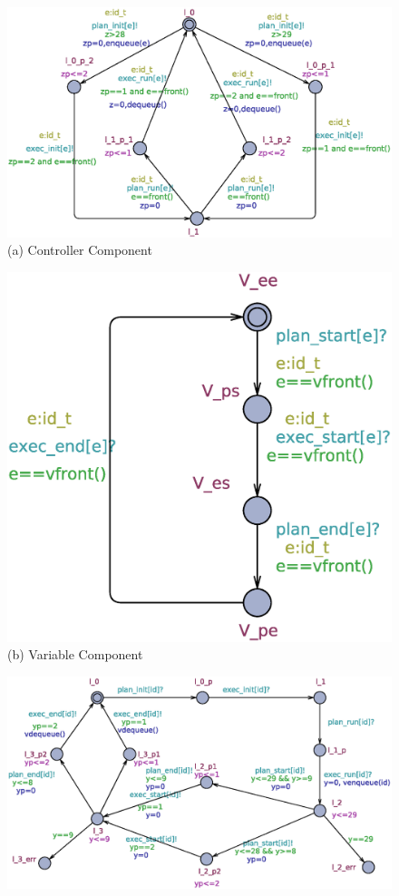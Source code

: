 \begin{figure}[ht] 
  \begin{minipage}[b]{0.5\linewidth}
  \centering
  \includegraphics[width=1.15\linewidth]{Figures/c.eps}\\ 
    (a) Controller Component 
  \vspace{4ex}
  \end{minipage}%
  \begin{minipage}[b]{0.5\linewidth}
  \centering
  \includegraphics[width=.75\linewidth]{Figures/v.eps}\\ 
    (b) Variable Component 
  \vspace{4ex}
  \end{minipage} 
  \begin{minipage}[b]{\linewidth}
  \centering
  \includegraphics[width=0.75\linewidth]{Figures/t.eps}\\ 

\end{minipage}
\end{figure}
